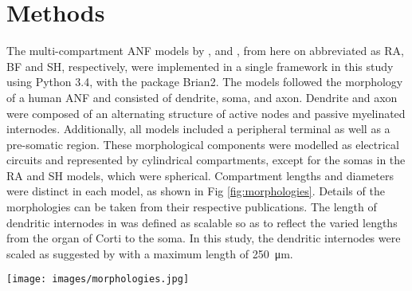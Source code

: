 \documentclass[utf8]{frontiersSCNS} %
\begin{document}
\section{Methods}
\label{sec:methods}
The multi-compartment ANF models by \cite{Rattay2001}, \cite{Briaire2005} and \cite{Smit2010}, from here on abbreviated as RA, BF and SH, respectively,  were implemented in a single framework in this study using Python 3.4, with the package Brian2. %
The models followed the morphology of a human ANF and consisted of dendrite, soma, and axon. Dendrite and axon were composed of an alternating structure of active nodes and passive myelinated internodes. Additionally, all models included a peripheral terminal as well as a pre-somatic region. These morphological components were modelled as electrical circuits and represented by cylindrical compartments, except for the somas in the RA and SH models, which were spherical. Compartment lengths and diameters were distinct in each model, as shown in Fig \ref{fig:morphologies}. Details of the morphologies can be taken from their respective publications. %
The length of dendritic internodes in \cite{Briaire2005} was defined as scalable so as to reflect the varied lengths from the organ of Corti to the soma. In this study, the dendritic internodes were scaled as suggested by \cite{Kalkman2014a} with a maximum length of \SI{250}{\micro\meter}.




\begin{figure*}[htb]
  \centering  
  \texttt{[image: images/morphologies.jpg]}
  \caption{Comparison of the ANF morphologies. All dendrites and axons were myelinated, denoted by the blue color. The somas of all three models were unmyelinated but surrounded by layers of ``satellite cells", as described in \cite{Rattay2001}, and so was the pre-somatic region of the BF model %
  . Relative differences in compartment size among the three models are indicated in the figure, but they are not true to scale.%
  }
  \label{fig:morphologies}
\end{figure*}
\end{document}
